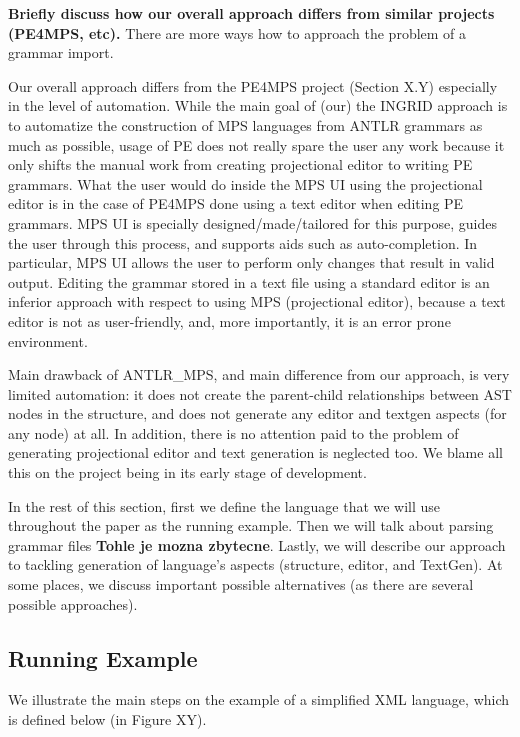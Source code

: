 \documentclass[10pt]{sigplanconf}
\newcommand{\todo}[1]{{\bfseries #1}}
\begin{document}
\todo{Briefly discuss how our overall approach differs from similar projects (PE4MPS, etc).}
There are more ways how to approach the problem of a grammar import.

Our overall approach differs from the PE4MPS project (Section X.Y) especially in the level of automation.
While the main goal of (our) the INGRID approach is to automatize the construction of MPS languages from ANTLR grammars as much as possible, usage of PE does not really spare the user any work because it only shifts the manual work from creating projectional editor to writing PE grammars.
What the user would do inside the MPS UI using the projectional editor is in the case of PE4MPS done using a text editor when editing PE grammars.
MPS UI is specially designed/made/tailored for this purpose, guides the user through this process, and supports aids such as auto-completion. In particular, MPS UI allows the user to perform only changes that result in valid output.
Editing the grammar stored in a text file using a standard editor is an inferior approach with respect to using MPS (projectional editor), because a text editor is not as user-friendly, and, more importantly, it is an error prone environment.

Main drawback of ANTLR{\_}MPS, and main difference from our approach, is very limited automation: it does not create the parent-child relationships between AST nodes in the structure, and does not generate any editor and textgen aspects (for any node) at all.
In addition, there is no attention paid to the problem of generating projectional editor and text generation is neglected too.
We blame all this on the project being in its early stage of development.

In the rest of this section, first we define the language that we will use throughout the paper as the running example.
Then we will talk about parsing grammar files \todo{Tohle je mozna zbytecne}.
Lastly, we will describe our approach to tackling generation of language's aspects (structure, editor, and TextGen).
At some places, we discuss important possible alternatives (as there are several possible approaches).

\subsection{Running Example}

We illustrate the main steps on the example of a simplified XML language, which is defined below (in Figure XY).
\end{document}
